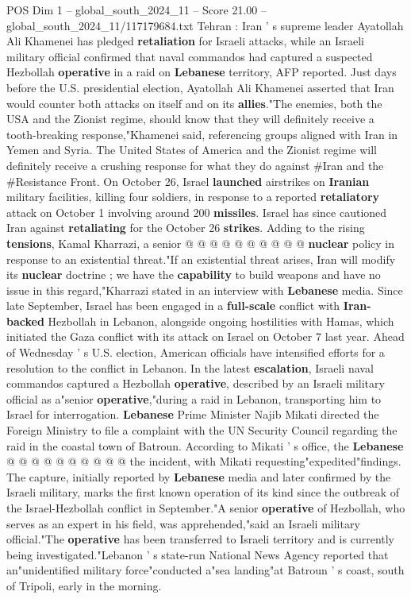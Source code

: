 \begin{textsample}{POS Dim 1 – global\_south\_2024\_11 – Score 21.00 – global\_south\_2024\_11/117179684.txt}  \label{ex:f1_pos_173}
Tehran : Iran ' s supreme leader Ayatollah Ali Khamenei has pledged \textbf{retaliation} for Israeli attacks, while an Israeli military official confirmed that naval commandos had captured a suspected Hezbollah \textbf{operative} in a raid on \textbf{Lebanese} territory, AFP reported.
Just days before the U.S. presidential election, Ayatollah Ali Khamenei asserted that Iran would counter both attacks on itself and on its \textbf{allies}."The enemies, both the USA and the Zionist regime, should know that they will definitely receive a tooth-breaking response,"Khamenei said, referencing groups aligned with Iran in Yemen and Syria.
The United States of America and the Zionist regime will definitely receive a crushing response for what they do against \#Iran and the \#Resistance Front.
On October 26, Israel \textbf{launched} airstrikes on \textbf{Iranian} military facilities, killing four soldiers, in response to a reported \textbf{retaliatory} attack on October 1 involving around 200 \textbf{missiles}.
Israel has since cautioned Iran against \textbf{retaliating} for the October 26 \textbf{strikes}.
Adding to the rising \textbf{tensions}, Kamal Kharrazi, a senior @ @ @ @ @ @ @ @ @ @ \textbf{nuclear} policy in response to an existential threat."If an existential threat arises, Iran will modify its \textbf{nuclear} doctrine ; we have the \textbf{capability} to build weapons and have no issue in this regard,"Kharrazi stated in an interview with \textbf{Lebanese} media.
Since late September, Israel has been engaged in a \textbf{full-scale} conflict with \textbf{Iran-backed} Hezbollah in Lebanon, alongside ongoing hostilities with Hamas, which initiated the Gaza conflict with its attack on Israel on October 7 last year.
Ahead of Wednesday ' s U.S. election, American officials have intensified efforts for a resolution to the conflict in Lebanon.
In the latest \textbf{escalation}, Israeli naval commandos captured a Hezbollah \textbf{operative}, described by an Israeli military official as a"senior \textbf{operative},"during a raid in Lebanon, transporting him to Israel for interrogation. \textbf{Lebanese} Prime Minister Najib Mikati directed the Foreign Ministry to file a complaint with the UN Security Council regarding the raid in the coastal town of Batroun.
According to Mikati ' s office, the \textbf{Lebanese} @ @ @ @ @ @ @ @ @ @ the incident, with Mikati requesting"expedited"findings.
The capture, initially reported by \textbf{Lebanese} media and later confirmed by the Israeli military, marks the first known operation of its kind since the outbreak of the Israel-Hezbollah conflict in September."A senior \textbf{operative} of Hezbollah, who serves as an expert in his field, was apprehended,"said an Israeli military official."The \textbf{operative} has been transferred to Israeli territory and is currently being investigated."Lebanon ' s state-run National News Agency reported that an"unidentified military force"conducted a"sea landing"at Batroun ' s coast, south of Tripoli, early in the morning.

\end{textsample}
